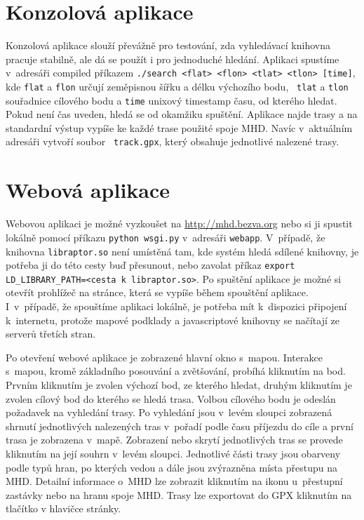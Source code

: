 \section{Konzolová aplikace}
Konzolová aplikace slouží převážně pro testování, zda vyhledávací knihovna
pracuje stabilně, ale dá se použít i pro jednoduché hledání. Aplikaci spustíme
v~adresáři compiled příkazem {\tt ./search <flat> <flon> <tlat> <tlon> [time]},
kde {\tt flat} a {\tt flon} určují zeměpisnou šířku a délku výchozího bodu, {\tt
tlat} a {\tt tlon} souřadnice cílového bodu a {\tt time} unixový timestamp času,
od kterého hledat. Pokud není čas uveden, hledá se od
okamžiku spuštění.  Aplikace najde trasy a na standardní výstup vypíše ke každé
trase použité spoje MHD. Navíc v~aktuálním adresáři vytvoří soubor {\tt
track.gpx}, který obsahuje jednotlivé nalezené trasy.
 
\section{Webová aplikace}
Webovou aplikaci je možné vyzkoušet na \url{http://mhd.bezva.org} nebo si ji spustit lokálně
pomocí příkazu {\tt python wsgi.py} v~adresáři {\tt webapp}. V~případě, že knihovna
{\tt libraptor.so} není umístěná tam, kde systém hledá sdílené knihovny, je potřeba ji
do této cesty buď přesunout, nebo zavolat příkaz {\tt export
LD\_LIBRARY\_PATH=<cesta k~libraptor.so>}. Po spuštění aplikace je možné si
otevřít prohlížeč na stránce, která se vypíše během spouštění aplikace.
I~v~případě, že spouštíme aplikaci lokálně, je potřeba mít k~dispozici připojení
k~internetu, protože mapové podklady a javascriptové knihovny se načítají ze
serverů třetích stran.

Po otevření webové aplikace je zobrazené hlavní okno s~mapou. Interakce s~mapou,
kromě základního posouvání a zvětšování, probíhá kliknutím na bod. Prvním
kliknutím je zvolen výchozí bod, ze kterého hledat, druhým kliknutím je zvolen
cílový bod do kterého se hledá trasa. Volbou cílového bodu je odeslán požadavek
na vyhledání trasy. Po vyhledání jsou v~levém sloupci zobrazená shrnutí
jednotlivých nalezených tras v~pořadí podle času příjezdu do cíle a první trasa
je zobrazena v~mapě. Zobrazení nebo skrytí jednotlivých tras se provede
kliknutím na její souhrn v~levém sloupci. Jednotlivé části trasy jsou obarveny
podle typů hran, po kterých vedou a dále jsou zvýrazněna místa přestupu na MHD.
Detailní informace o~MHD lze zobrazit kliknutím na ikonu u~přestupní zastávky
nebo na hranu spoje MHD. Trasy lze exportovat do GPX kliknutím na tlačítko
 v hlavičce stránky.
